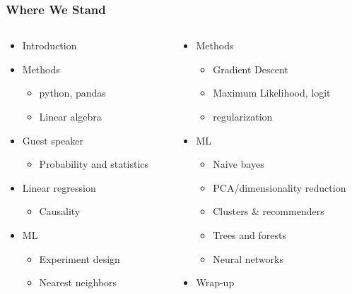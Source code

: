 \documentclass[mathserif, xcolor=table, svgnames]{beamer}
\begin{document}
\begin{frame}
\frametitle{Where We Stand}
\begin{columns}
  \begin{column}{0.5\linewidth}
    \begin{itemize}
    \item Introduction
    \item Methods
      \begin{itemize}
      \item python, pandas
      \item Linear algebra
      \end{itemize}
    \item Guest speaker
      \begin{itemize}
      \item \alert{Probability and statistics}
      \end{itemize}
    \item Linear regression
      \begin{itemize}
      \item Causality
      \end{itemize}
    \item ML
      \begin{itemize}
      \item Experiment design
      \item Nearest neighbors
      \end{itemize}
    \end{itemize}
  \end{column}
  \begin{column}{0.5\linewidth}
    \begin{itemize}
    \item Methods
      \begin{itemize}
      \item Gradient Descent 
      \item Maximum Likelihood, logit
      \item regularization
      \end{itemize}
    \item ML
      \begin{itemize}
      \item Naive bayes
      \item PCA/dimensionality reduction
      \item Clusters \& recommenders
      \item Trees and forests
      \item Neural networks
      \end{itemize}
    \item Wrap-up
    \end{itemize}
  \end{column}
\end{columns}
\end{frame}
\end{document}
